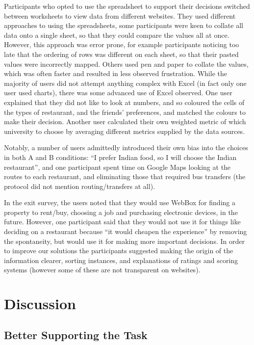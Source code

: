 \documentclass{sigchi}
\begin{document}
Participants who opted to use the spreadsheet to support their decisions switched between worksheets to view data from different websites.  They used different approaches to using the spreadsheets, some participants were keen to collate all data onto a single sheet, so that they could compare the values all at once. However, this approach was error prone, for example participants noticing too late that the ordering of rows was different on each sheet, so that their pasted values were incorrectly mapped. Others used pen and paper to collate the values, which was often faster and resulted in less observed frustration. While the majority of users did not
attempt anything complex with Excel (in fact only one user used charts), there was some advanced use of Excel observed.
One user explained that they did not like to look at numbers, and so coloured the cells of the types of restaurant, and the
friends' preferences, and matched the colours to make their decision. Another user calculated their own weighted metric
of which university to choose by averaging different metrics supplied by the data sources.

Notably, a number of users admittedly introduced their own bias into the choices in both A and B conditions: ``I prefer Indian food, so I will choose the Indian restaurant'', and one participant spent time on Google Maps looking at the routes to each restaurant, and eliminating those that required bus transfers (the protocol did not mention routing/transfers at all).

In the exit survey, the users noted that they would use WebBox for finding a property to rent/buy, choosing a job and purchasing electronic devices, in the future.  However, one participant said that they would not use it for things like deciding on a restaurant because ``it would cheapen the experience'' by removing the spontaneity, but would use it for making more important decisions.  In order to improve our solutions the participants suggested making the origin of the information clearer, sorting instances, and explanations of ratings and scoring systems (however some of these are not transparent on websites).

\section{Discussion}

\subsection{Better Supporting the Task}
\end{document}
